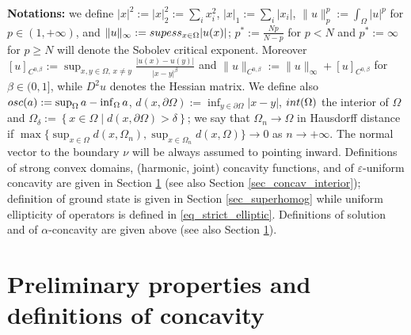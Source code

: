 \documentclass[11pt, reqno]{amsart}
\theoremstyle{definition}
\numberwithin{equation}{section}
\def\eps{\varepsilon}
\def\norm#1{\|#1\|}
\begin{document}
\medskip

\textbf{Notations:} 
we define $|x|^2:=|x|_2^2:= \sum_i x_i^2$, $|x|_1:=\sum_i |x_i|$, $\norm{u}_p^p:=\int_{\Omega} |u|^p $ for $p \in (1,+\infty)$, and $\norm{u}_{\infty}:= \textup{supess}_{x\in \Omega} |u(x)|$; $p^*:= \frac{Np}{N-p}$ for $p<N$ and $p^*:=\infty$ for $p\geq N$ will denote the Sobolev critical exponent. Moreover $[u]_{C^{0,\beta}}:= \sup_{x,y \in \Omega, \, x \neq y} \frac{|u(x)-u(y)|}{|x-y|^{\beta}}$ and $\norm{u}_{C^{0,\beta}}:= \norm{u}_{\infty} + [u]_{C^{0,\beta}}$ for $\beta \in (0,1]$, while $D^2 u$ denotes the Hessian matrix.
We define also $\textup{osc}(a):=\sup_{\Omega} a - \inf_{\Omega} a$, $d(x,\partial \Omega):= \inf_{y \in \partial \Omega} |x-y|$, $\textup{int}(\Omega)$ the interior of $\Omega$ and $\Omega_{\delta}:= \left\{ x \in \Omega \mid d(x,\partial \Omega) >\delta\right\}$; we say that $\Omega_n \to \Omega$ in Hausdorff distance if $\max\{\sup_{x \in \Omega} d(x,\Omega_n), \sup_{x \in \Omega_n} d(x,\Omega)\} \to 0$ as $n \to +\infty$. The normal vector to the boundary $\nu$ will be always assumed to pointing inward. 
Definitions of strong convex domains, (harmonic, joint) concavity functions, and of $\eps$-uniform concavity are given in Section \ref{sec_prelimin} (see also Section \ref{sec_concav_interior}); definition of ground state is given in Section \ref{sec_superhomog} while uniform ellipticity of operators is defined in \eqref{eq_strict_elliptic}.
Definitions of solution and of $\alpha$-concavity are given above (see also Section \ref{sec_prelimin}).



\section{Preliminary properties and definitions of concavity}
\label{sec_prelimin}
\end{document}
